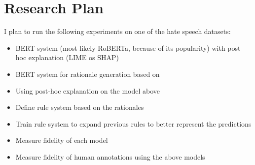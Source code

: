 \documentclass[]{article}
\begin{document}
\section{Research Plan}

I plan to run the following experiments on one of the hate speech datasets:

\begin{itemize}
	\item BERT system (most likely RoBERTa, because of its popularity) with post-hoc explanation (LIME os SHAP)
	\item BERT system for rationale generation based on \cite{DeYoung:2020}
	\item Using post-hoc explanation on the model above
	\item Define rule system based on the rationales
	\item Train rule system to expand previous rules to better represent the predictions
	\item Measure fidelity of each model
	\item Measure fidelity of human annotations using the above models
\end{itemize}



\end{document}
